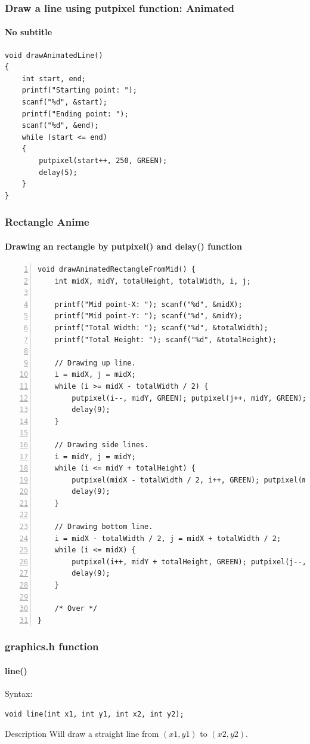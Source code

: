 \begin{frame}[fragile]
\frametitle{Draw a line using putpixel function: Animated}
\framesubtitle{No subtitle}
\pause
\begin{lstlisting}[caption=Animated Line, basicstyle=\small]
void drawAnimatedLine()
{
    int start, end;
    printf("Starting point: ");
    scanf("%d", &start);
    printf("Ending point: ");
    scanf("%d", &end);
    while (start <= end)
    {
        putpixel(start++, 250, GREEN);
        delay(5);
    }
}
\end{lstlisting}
\end{frame}

\begin{frame}[fragile]
\frametitle{Rectangle Anime}
\framesubtitle{Drawing an rectangle by putpixel() and delay() function}
\pause
\begin{lstlisting}[basicstyle=\tiny, frameround=fttt, frame=trBL, numbers=left]
void drawAnimatedRectangleFromMid() {
    int midX, midY, totalHeight, totalWidth, i, j;

    printf("Mid point-X: "); scanf("%d", &midX);
    printf("Mid point-Y: "); scanf("%d", &midY);
    printf("Total Width: "); scanf("%d", &totalWidth);
    printf("Total Height: "); scanf("%d", &totalHeight);

    // Drawing up line.
    i = midX, j = midX;
    while (i >= midX - totalWidth / 2) {
        putpixel(i--, midY, GREEN); putpixel(j++, midY, GREEN);
        delay(9);
    }

    // Drawing side lines.
    i = midY, j = midY;
    while (i <= midY + totalHeight) {
        putpixel(midX - totalWidth / 2, i++, GREEN); putpixel(midX + totalWidth / 2, j++, GREEN);
        delay(9);
    }

    // Drawing bottom line.
    i = midX - totalWidth / 2, j = midX + totalWidth / 2;
    while (i <= midX) {
        putpixel(i++, midY + totalHeight, GREEN); putpixel(j--, midY + totalHeight, GREEN);
        delay(9);
    }

    /* Over */
}
\end{lstlisting}
\end{frame}

\begin{frame}[fragile]
\frametitle{graphics.h function}
\framesubtitle{line()}
\pause
\alert{Syntax:}
\begin{lstlisting}
void line(int x1, int y1, int x2, int y2);
\end{lstlisting}
\pause
\begin{block}{Description}
Will draw a straight line from $(x1, y1)$ to $(x2, y2)$.
\end{block}
\end{frame}

